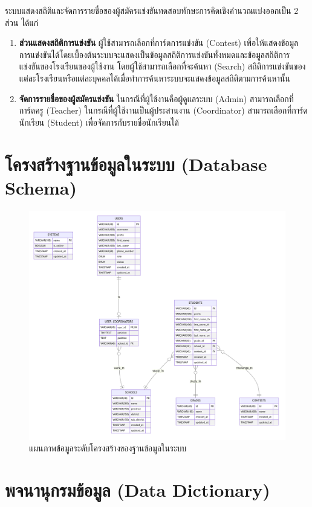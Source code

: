 ระบบแสดงสถิติและจัดการรายชื่อของผู้สมัครแข่งขันทดสอบทักษะการคิดเชิงคำนวณแบ่งออกเป็น 2 ส่วน ได้แก่

\begin{enumerate}
    \item \textbf{ส่วนแสดงสถิติการแข่งขัน} ผู้ใช้สามารถเลือกที่การ์ดการแข่งขัน (Contest) เพื่อให้แสดงข้อมูลการแข่งขันได้โดยเบื้องต้นระบบจะแสดงเป็นข้อมูลสถิติการแข่งขันทั้งหมดและข้อมูลสถิติการแข่งขันของโรงเรียนของผู้ใช้งาน โดยผู้ใช้สามารถเลือกที่จะค้นหา (Search) สถิติการแข่งขันของแต่ละโรงเรียนหรือแต่ละบุคคลได้เมื่อทำการค้นหาระบบจะแสดงข้อมูลสถิติตามการค้นหานั้น
    \item \textbf{จัดการรายชื่อของผู้สมัครแข่งขัน} ในกรณีที่ผู้ใช้งานคือผู้ดูแลระบบ (Admin) สามารถเลือกที่การ์ดครู (Teacher) ในกรณีที่ผู้ใช้งานเป็นผู้ประสานงาน (Coordinator) สามารถเลือกที่การ์ดนักเรียน (Student) เพื่อจัดการกับรายชื่อนักเรียนได้
\end{enumerate}

\section{โครงสร้างฐานข้อมูลในระบบ (Database Schema)}

\begin{figure}[ht]
    \centering
    \includegraphics[width=120mm,scale=1.0]{diagrams/database.png}
    \caption{แผนภาพข้อมูลระดับโครงสร้างของฐานข้อมูลในระบบ}
    \label{fig:physical-database-diagram}
\end{figure}

\section{พจนานุกรมข้อมูล (Data Dictionary)}

